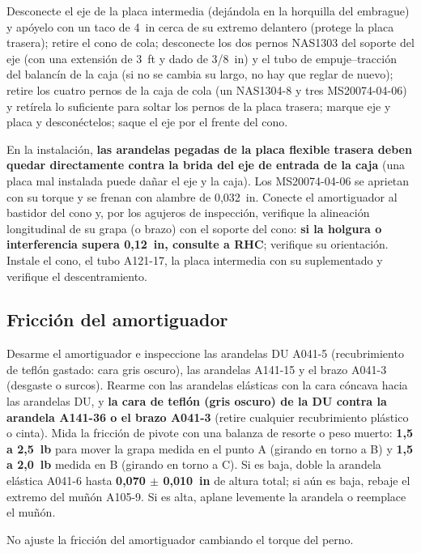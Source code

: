 Desconecte el eje de la placa intermedia (dejándola en la horquilla del embrague) y apóyelo con un taco de 4~in cerca de su extremo delantero (protege la placa trasera); retire el cono de cola; desconecte los dos pernos NAS1303 del soporte del eje (con una extensión de 3~ft y dado de 3/8~in) y el tubo de empuje--tracción del balancín de la caja (si no se cambia su largo, no hay que reglar de nuevo); retire los cuatro pernos de la caja de cola (un NAS1304-8 y tres MS20074-04-06) y retírela lo suficiente para soltar los pernos de la placa trasera; marque eje y placa y desconéctelos; saque el eje por el frente del cono.

En la instalación, \textbf{las arandelas pegadas de la placa flexible trasera deben quedar directamente contra la brida del eje de entrada de la caja} (una placa mal instalada puede dañar el eje y la caja). Los MS20074-04-06 se aprietan con su torque y se frenan con alambre de 0,032~in. Conecte el amortiguador al bastidor del cono y, por los agujeros de inspección, verifique la alineación longitudinal de su grapa (o brazo) con el soporte del cono: \textbf{si la holgura o interferencia supera 0,12~in, consulte a RHC}; verifique su orientación. Instale el cono, el tubo A121-17, la placa intermedia con su suplementado y verifique el descentramiento.

\subsection{Fricción del amortiguador}

Desarme el amortiguador e inspeccione las arandelas DU A041-5 (recubrimiento de teflón gastado: cara gris oscuro), las arandelas A141-15 y el brazo A041-3 (desgaste o surcos). Rearme con las arandelas elásticas con la cara cóncava hacia las arandelas DU, y \textbf{la cara de teflón (gris oscuro) de la DU contra la arandela A141-36 o el brazo A041-3} (retire cualquier recubrimiento plástico o cinta). Mida la fricción de pivote con una balanza de resorte o peso muerto: \textbf{1,5 a 2,5~lb} para mover la grapa medida en el punto A (girando en torno a B) y \textbf{1,5 a 2,0~lb} medida en B (girando en torno a C). Si es baja, doble la arandela elástica A041-6 hasta \textbf{0,070 $\pm$ 0,010~in} de altura total; si aún es baja, rebaje el extremo del muñón A105-9. Si es alta, aplane levemente la arandela o reemplace el muñón.

\begin{precaucion}
No ajuste la fricción del amortiguador cambiando el torque del perno.
\end{precaucion}

